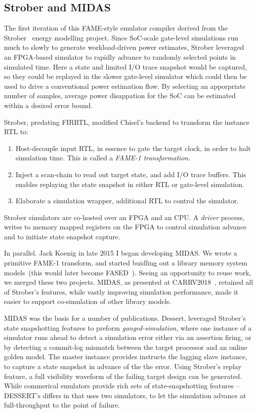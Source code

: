 \subsection{Strober and MIDAS}

The first iteration of this FAME-style emulator compiler derived from the
Strober~\cite{Strober} energy modelling project. Since SoC-scale gate-level
simulations run much to slowly to generate workload-driven power estimates,
Strober leveraged an FPGA-based simulator to rapidly advance to randomly
selected points in simulated time. Here a state and limited I/O trace snapshot would be
captured, so they could be replayed in the slower gate-level simulator which
could then be used to drive a conventional power estimation flow. By selecting an apporpriate number of samples,
average power disappation for the SoC can be estimated within a desired error bound.

Strober, predating FIRRTL, modified Chisel's backend to transform the instance RTL to:
\begin{enumerate}
    \item Host-decouple input RTL, in essence to gate the target clock, in order to halt simulation time. This is called
        a \emph{FAME-1 transformation}.
    \item Inject a scan-chain to read out target state, and add I/O trace buffers. This enables replaying the state snapshot in either
        RTL or gate-level simulation.
    \item Elaborate a simulation wrapper, additional RTL to control the simulator.
\end{enumerate}

Strober simulators are co-hosted over an FPGA and an CPU. A \emph{driver} process, writes to memory mapped registers
on the FPGA to control simulation advance and to initiate state snapshot capture.

In parallel. Jack Koenig in late 2015 I began developing MIDAS. We wrote a
primitive FAME-1 transform, and started buidling out a library memory system
models~(this would later become FASED~\cite{FASED}).  Seeing an opportunity to
reuse work, we merged these two projects. MIDAS, as presented at
CARRV2018~\cite{MIDAS}, retained all of Strober's features, while vastly
improving simulation performance, made it
easier to support co-simulation of other library models.

MIDAS was the basis for a number of publications. Dessert, leveraged Strober's
state snapshotting features to preform \emph{ganged-simulation}, where one
instance of a simulator runs ahead to detect a simulation error either via an
assertion firing, or by detecting a commit-log mismatch between the target
processor and an online golden model. The master instance provides instructs
the lagging slave instance, to capture a state snapshot in advance of the the
error.  Using Strober's replay feature, a full visibility waveform of the
failing target design can be generated. While commerical emulators provide rich
sets of state-snapshotting features -- DESSERT's differs in that uses two
simulators, to let the simulation advance at full-throughput to the point of
failure.

